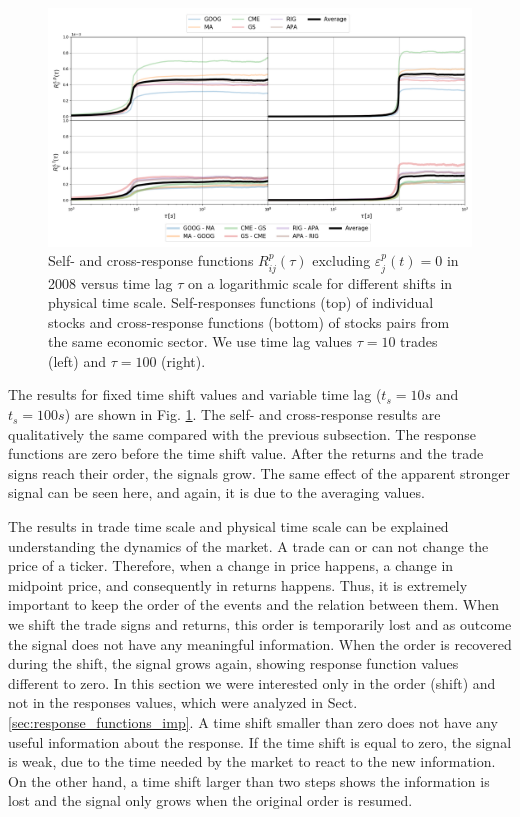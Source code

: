 \begin{figure}[htbp]
    \centering
    \includegraphics[width=\textwidth]{figures/04_shift_responses_physical.png}
    \caption{Self- and cross-response functions $R^{p}_{ij}\left(\tau\right)$
             excluding $\varepsilon^{p}_{j}\left(t\right) = 0$ in 2008 versus
             time lag $\tau$ on a logarithmic scale for different shifts in
             physical time scale. Self-responses functions (top) of individual
             stocks and cross-response functions (bottom) of stocks pairs from
             the same economic sector. We use time lag values $\tau=10$ trades
             (left) and $\tau=100$ (right).}
    \label{fig:shift_responses_physical_scale}
\end{figure}

The results for fixed time shift values and variable time lag ($t_{s}=10s$ and
$t_{s}=100s$) are shown in Fig. \ref{fig:shift_responses_physical_scale}. The
self- and cross-response results are qualitatively the same compared with the
previous subsection. The response functions are zero before the time shift
value. After the returns and the trade signs reach their order, the signals
grow. The same effect of the apparent stronger signal can be seen here, and
again, it is due to the averaging values.

The results in trade time scale and physical time scale can be explained
understanding the dynamics of the market. A trade can or can not change the
price of a ticker. Therefore, when a change in price happens, a change in
midpoint price, and consequently in returns happens. Thus, it is extremely
important to keep the order of the events and the relation between them. When
we shift the trade signs and returns, this order is temporarily lost and as
outcome the signal does not have any meaningful information. When the order is
recovered during the shift, the signal grows again, showing response function
values different to zero. In this section we were interested only in the order
(shift) and not in the responses values, which were analyzed in Sect.
\ref{sec:response_functions_imp}. A time shift smaller than zero does not have
any useful information about the response. If the time shift is equal to zero,
the signal is weak, due to the time needed by the market to react to the new
information. On the other hand, a time shift larger than two steps shows the
information is lost and the signal only grows when the original order is
resumed.

